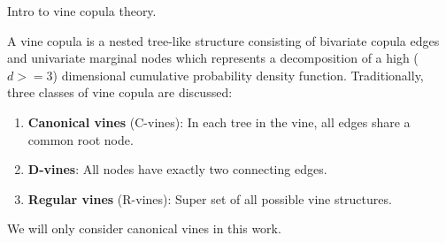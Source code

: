 Intro to vine copula theory.

A vine copula is a nested tree-like structure consisting of bivariate copula
edges and univariate marginal nodes which represents a decomposition of a high
($d>=3$) dimensional cumulative probability density function.  Traditionally,
three classes of vine copula are discussed:

\begin{enumerate}
    \item \textbf{Canonical vines} (C-vines):  In each tree in the vine, all edges share a common root node.
    \item \textbf{D-vines}:  All nodes have exactly two connecting edges.
    \item \textbf{Regular vines} (R-vines):  Super set of all possible vine structures.
\end{enumerate}

We will only consider canonical vines in this work.
